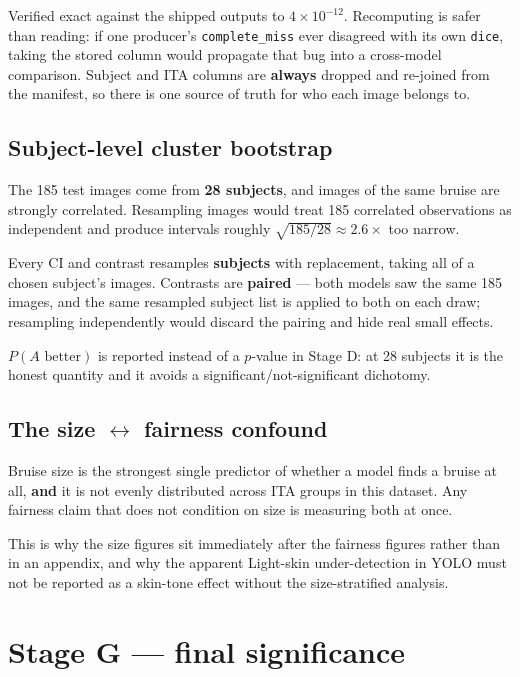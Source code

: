 \documentclass[11pt]{article}
\begin{document}
Verified exact against the shipped outputs to $4\times10^{-12}$. Recomputing is
safer than reading: if one producer's \texttt{complete\_miss} ever disagreed with
its own \texttt{dice}, taking the stored column would propagate that bug into a
cross-model comparison. Subject and ITA columns are \textbf{always} dropped and
re-joined from the manifest, so there is one source of truth for who each image
belongs to.

\subsection{Subject-level cluster bootstrap}

The 185 test images come from \textbf{28 subjects}, and images of the same bruise
are strongly correlated. Resampling images would treat 185 correlated observations
as independent and produce intervals roughly $\sqrt{185/28}\approx2.6\times$ too
narrow.

Every CI and contrast resamples \textbf{subjects} with replacement, taking all of
a chosen subject's images. Contrasts are \textbf{paired} --- both models saw the
same 185 images, and the same resampled subject list is applied to both on each
draw; resampling independently would discard the pairing and hide real small
effects.

$P(A\text{ better})$ is reported instead of a $p$-value in Stage D: at 28 subjects
it is the honest quantity and it avoids a significant/not-significant dichotomy.

\subsection{The size $\leftrightarrow$ fairness confound}
\label{sec:sizeconfound}

Bruise size is the strongest single predictor of whether a model finds a bruise at
all, \textbf{and} it is not evenly distributed across ITA groups in this dataset.
Any fairness claim that does not condition on size is measuring both at once.

This is why the size figures sit immediately after the fairness figures rather
than in an appendix, and why the apparent Light-skin under-detection in YOLO must
not be reported as a skin-tone effect without the size-stratified analysis.

\section{Stage G --- final significance}
\label{sec:stageg}
\end{document}
